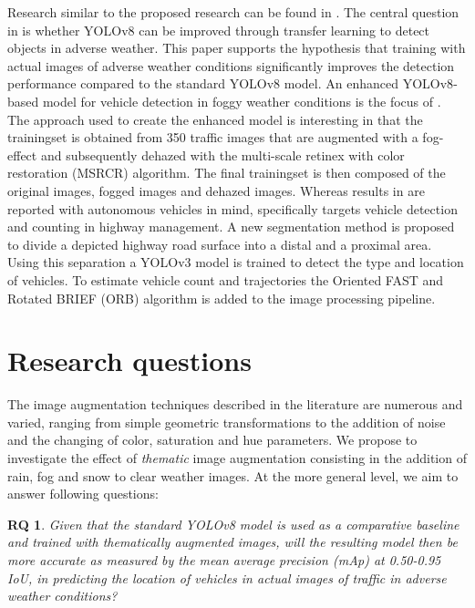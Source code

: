 \documentclass[]{article}
\newtheorem{researchquestion}{RQ}
\begin{document}
	Research similar to the proposed research can be found in \cite{kumarObjectDetectionAdverse2023}. The central question in \cite{kumarObjectDetectionAdverse2023} is whether YOLO{\small v8} can be improved through transfer learning to detect objects in adverse weather. This paper supports the hypothesis that training with actual images of adverse weather conditions significantly improves the detection performance compared to the standard YOLO{\small v8} model. An enhanced YOLO\small{v8}-based model for vehicle detection in foggy weather conditions is the focus of \cite{liVehicleDetectionFoggy2022}. The approach used to create the enhanced model is interesting in that the trainingset is obtained from 350 traffic images that are augmented with a fog-effect and subsequently dehazed with the multi-scale retinex with color restoration (MSRCR) algorithm. The final trainingset is then composed of the original images, fogged images and dehazed images. Whereas results in \cite{liVehicleDetectionFoggy2022} are reported with autonomous vehicles in mind, \cite{songVisionbasedVehicleDetection2019} specifically targets vehicle detection and counting in highway management.  A new segmentation method is proposed to divide a depicted highway road surface into a distal and a proximal area. Using this separation a YOLO{\small v3} model is trained to detect the type and location of vehicles. To estimate vehicle count and trajectories the Oriented FAST and Rotated BRIEF (ORB) algorithm is added to the image processing pipeline.
	

\section{Research questions}

	The image augmentation techniques described in the literature are numerous and varied, ranging from simple geometric transformations to the addition of noise and the changing of color, saturation and hue parameters. We propose to investigate the effect of \textit{thematic} image augmentation consisting in the addition of rain, fog and snow to clear weather images. At the more general level, we aim to answer following questions:

	\begin{researchquestion}
		\label{rq1}
		Given that the standard YOLO{\small v8} model is used as a comparative baseline and trained with thematically augmented images, will the resulting model then be more accurate as measured by the mean average precision (mAp) at 0.50-0.95 IoU, in predicting the location of vehicles in actual images of traffic in adverse weather conditions?
	\end{researchquestion}
\end{document}

